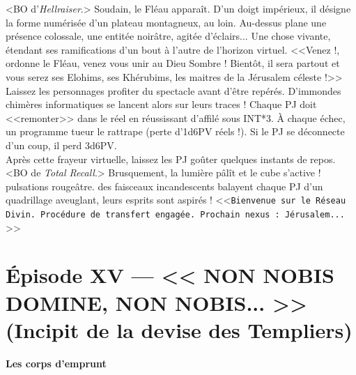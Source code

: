 \documentclass[11pt,twoside,a4paper]{book}
\begin{document}
<BO d'\emph{Hellraiser}.> Soudain, le Fl{\'e}au appara{\^i}t. D'un doigt imp{\'e}rieux, il d{\'e}signe la forme num{\'e}ris{\'e}e d'un plateau montagneux, au loin. Au-dessus plane une pr{\'e}sence colossale, une entit{\'e}e noir{\^a}tre, agit{\'e}e d'{\'e}clairs... Une chose vivante, {\'e}tendant ses ramifications d'un bout {\`a} l'autre de l'horizon virtuel. <<Venez !, ordonne le Fl{\'e}au, venez vous unir au Dieu Sombre ! Bient{\^o}t, il sera partout et vous serez ses Elohims, ses Kh{\'e}rubims, les maitres de la J{\'e}rusalem c{\'e}leste !>> Laissez les personnages profiter du spectacle avant d'{\^e}tre rep{\'e}r{\'e}s. D'immondes chim{\`e}res informatiques se lancent alors sur leurs traces ! Chaque PJ doit <<remonter>> dans le r{\'e}el en r{\'e}ussissant d'affil{\'e} sous INT*3. {\`A} chaque {\'e}chec, un programme tueur le rattrape (perte d'1d6PV r{\'e}els !). Si le PJ se d{\'e}connecte d'un coup, il perd 3d6PV.~\\

Apr{\`e}s cette frayeur virtuelle, laissez les PJ go{\^u}ter quelques instants de repos.~\\

<BO de \emph{Total Recall}.> Brusquement, la lumi{\`e}re p{\^a}l{\^i}t et le cube s'active ! pulsations rouge{\^a}tre. des faisceaux incandescents balayent chaque PJ d'un quadrillage aveuglant, leurs esprits sont aspir{\'e}s ! <<\texttt{Bienvenue sur le R{\'e}seau Divin. Proc{\'e}dure de transfert engag{\'e}e. Prochain nexus : J{\'e}rusalem... } >>~\\

\clearpage

\section*{{\'E}pisode XV --- << \textbf{NON NOBIS DOMINE, NON NOBIS... } >> (Incipit de la devise des Templiers)}


\textbf{\large Les corps d'emprunt}~\\
\end{document}
